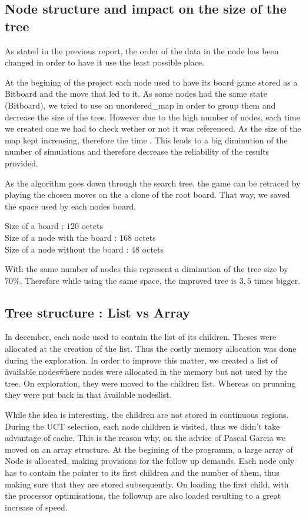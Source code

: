 \subsection{Node structure and impact on the size of the tree}

As stated in the previous report, the order of the data in the node has been changed in order to have it use the least possible place.

At the begining of the project each node used to have its board game stored as a Bitboard and the move that led to it. As some nodes had the same state (Bitboard), we tried to use an unordered\_map in order to group them and decrease the size of the tree. However due to the high number of nodes, each time we created one we had to check wether or not it was referenced. As the size of the map kept increasing, therefore the time . This leads to a big diminution of the number of simulations and therefore decrease the reliability of the results provided.

As the algorithm goes down through the search tree, the game can be retraced by playing the chosen moves on the a clone of the root board. That way, we saved the space used by each nodes board.

\noindent
Size of a board : $120$ octets\\
Size of a node with the board : $168$ octets\\
Size of a node without the board : $48$ octets

With the same number of nodes this represent a diminution of the tree size by $70\%$. Therefore while using the same space, the improved tree is $3,5$ times bigger.

\subsection{Tree structure : List vs Array}

In december, each node used to contain the list of its children. Theses were allocated at the creation of the list. Thus the costly memory allocation was done during the exploration.
In order to improve this matter, we created a list of \"available nodes\" where nodes were allocated in the memory but not used by the tree. On exploration, they were moved to the children list. Whereas on prunning they were put back in that \"available nodes\" list.

While the idea is interesting, the children are not stored in continuous regions. During the UCT selection, each node children is visited, thus we didn't take advantage of cache. This is the reason why, on the advice of Pascal Garcia we moved on an array structure. At the begining of the programm, a large array of Node is allocated, making provisions for the follow up demands. Each node only has to contain the pointer to its first children and the number of them, thus making sure that they are stored subsequently. On loading the first child, with the processor optimisations, the followup are also loaded resulting to a great increase of speed.

